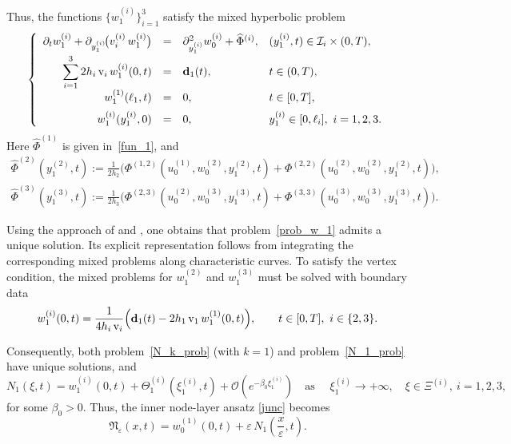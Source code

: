 \documentclass[reqno]{amsart}            %
\numberwithin{equation}{section}
\begin{document}
	Thus, the functions $\{w^{(i)}_1\}_{i=1}^3$ satisfy the  mixed hyperbolic problem
	\begin{equation}\label{prob_w_1}
		\left\{
		\begin{array}{rcll}
			\partial_t w^{(i)}_1
			+ \partial_{y_1^{(i)}}\!\big(v_i^{(i)}\, w^{(i)}_1\big)
			&=&
			\partial_{y^{(i)}_1}^2 w^{(i)}_0
			+ \widehat{\Phi}^{(i)},
			& (y_1^{(i)},t)\in\mathcal{I}_i\times(0,T),
			\\[2mm]
			\displaystyle \sum_{i=1}^{3} 2 h_i\,\mathrm{v}_i\, w_1^{(i)}(0,t)
			&=& {\bf d}_1(t),
			& t\in(0,T),
			\\[2mm]
			w_1^{(1)}(\ell_1,t) &=& 0,
			& t\in[0,T],
			\\[2mm]
			w_1^{(i)}(y_1^{(i)},0) &=& 0,
			& y_1^{(i)}\in[0,\ell_i],\ i=1,2,3.
		\end{array}
		\right.
	\end{equation}
	Here $\widehat{\Phi}^{(1)}$ is given in~\eqref{fun_1}, and
	\begin{gather}\label{fun_2}
		\widehat{\Phi}^{(2)}(y^{(2)}_1,t)
		:= \frac{1}{2h_2}\Big(
		\Phi^{(1,2)}(u^{(1)}_0,w^{(2)}_0,y^{(2)}_1,t)
		+
		\Phi^{(2,2)}(u^{(2)}_0,w^{(2)}_0,y^{(2)}_1,t)
		\Big),
		\\[2mm]
		\label{fun_3}
		\widehat{\Phi}^{(3)}(y^{(3)}_1,t)
		:= \frac{1}{2h_3}\Big(
		\Phi^{(2,3)}(u^{(2)}_0,w^{(3)}_0,y^{(3)}_1,t)
		+
		\Phi^{(3,3)}(u^{(3)}_0,w^{(3)}_0,y^{(3)}_1,t)
		\Big).
	\end{gather}
	
	Using the approach of \cite[Sect.~3]{Mel-Roh_AA-2024} and \cite[\S\,3.3]{Mel-Roh_JMAA-2024}, one obtains that problem~\eqref{prob_w_1} admits a unique solution.  
	Its explicit representation follows from integrating the corresponding mixed problems along characteristic curves.  
	To satisfy the vertex condition, the mixed problems for $w^{(2)}_1$ and $w^{(3)}_1$ must be solved with boundary data
	\[
	w^{(i)}_1(0,t)
	=
	\frac{1}{4 h_i\,\mathrm{v}_i}
	\Big(
	{\bf d}_1(t) - 2 h_1\,\mathrm{v}_1\, w_1^{(1)}(0,t)
	\Big),
	\qquad t\in[0,T],\ i\in\{2,3\}.
	\]
	
	
	
	Consequently, both problem~\eqref{N_k_prob} (with $k=1$) and
	problem~\eqref{N_1_prob} have unique solutions, and
	\begin{equation}\label{exp-decrease+1}
		N_1(\xi,t)
		=
		w^{(i)}_1(0,t)
		+
		\Theta^{(i)}_1(\xi^{(i)}_1,t)
		+
		\mathcal{O}\!\left(e^{-\beta_0 \xi^{(i)}_1}\right)
		\quad\text{as } \quad \xi^{(i)}_1\to+\infty,
		\quad \xi\in\Xi^{(i)},\ i=1,2,3,
	\end{equation}
	for some $\beta_0>0.$ Thus, the inner node-layer ansatz \eqref{junc} becomes 
	\begin{equation}\label{junc+1}
		\mathfrak{N}_\varepsilon(x,t)
		= w_0^{(1)}(0,t) + \varepsilon\,N_1\!\left(\frac{x}{\varepsilon},t\right).
	\end{equation}
	
\end{document}
